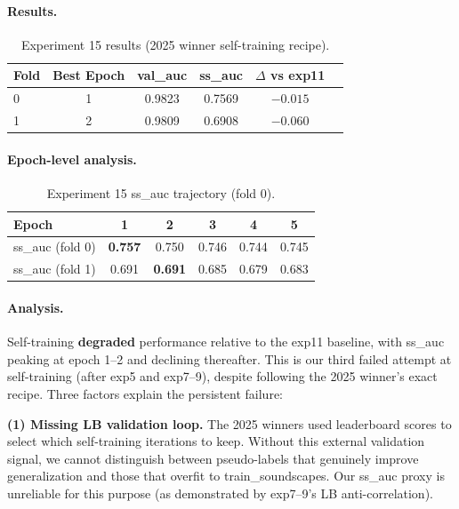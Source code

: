 \paragraph{Results.}
\begin{table}[h]
\centering
\caption{Experiment 15 results (2025 winner self-training recipe).}
\label{tab:exp15}
\begin{tabular}{lccccc}
\hline
\textbf{Fold} & \textbf{Best Epoch} & \textbf{val\_auc} & \textbf{ss\_auc} & \textbf{$\Delta$ vs exp11} \\
\hline
0 & 1 & 0.9823 & 0.7569 & $-0.015$ \\
1 & 2 & 0.9809 & 0.6908 & $-0.060$ \\
\hline
\end{tabular}
\end{table}

\paragraph{Epoch-level analysis.}
\begin{table}[h]
\centering
\caption{Experiment 15 ss\_auc trajectory (fold 0).}
\label{tab:exp15-trajectory}
\begin{tabular}{lccccc}
\hline
\textbf{Epoch} & 1 & 2 & 3 & 4 & 5 \\
\hline
ss\_auc (fold 0) & \textbf{0.757} & 0.750 & 0.746 & 0.744 & 0.745 \\
ss\_auc (fold 1) & 0.691 & \textbf{0.691} & 0.685 & 0.679 & 0.683 \\
\hline
\end{tabular}
\end{table}

\paragraph{Analysis.}
Self-training \textbf{degraded} performance relative to the exp11 baseline,
with ss\_auc peaking at epoch 1--2 and declining thereafter. This is our third
failed attempt at self-training (after exp5 and exp7--9), despite following the
2025 winner's exact recipe. Three factors explain the persistent failure:

\textbf{(1) Missing LB validation loop.}
The 2025 winners used leaderboard scores to select which self-training
iterations to keep. Without this external validation signal, we cannot
distinguish between pseudo-labels that genuinely improve generalization and
those that overfit to train\_soundscapes. Our ss\_auc proxy is unreliable
for this purpose (as demonstrated by exp7--9's LB anti-correlation).

